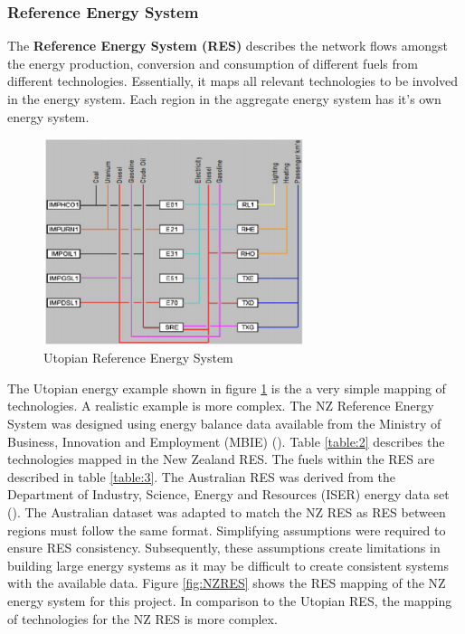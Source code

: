 \documentclass[12pt]{article}
\begin{document}
\subsubsection{Reference Energy System}
The \textbf{Reference Energy System (RES)} describes the network flows amongst the energy production, conversion and consumption of different fuels from different technologies.
Essentially, it maps all relevant technologies to be involved in the energy system. Each region in the aggregate energy system has it's own energy system.

\begin{figure}
	\begin{center}
		\includegraphics[width=0.68\textwidth]{URES.png}
	\end{center}
	\caption{Utopian Reference Energy System}
	\label{fig:URES}
\end{figure}
The Utopian energy example shown in figure \ref{fig:URES} is the a very simple mapping of technologies.
A realistic example is more complex. The NZ Reference Energy System was designed using energy balance data available from
the Ministry of Business, Innovation and Employment (MBIE) (\cite{MBIE_ESEM}). 
Table \ref{table:2} describes the technologies mapped in the New Zealand RES.
The fuels within the RES are described in table \ref{table:3}.
The Australian RES was derived from the Department of Industry, Science, Energy and Resources (ISER) energy data set (\cite{DOEA_ESEM}).
The Australian dataset was adapted to match the NZ RES as RES between regions must follow the same format. 
Simplifying assumptions were required to ensure RES consistency.  
Subsequently, these assumptions create limitations in building large energy systems as it may be difficult to create consistent systems with the available data.
Figure \ref{fig:NZRES} shows the RES mapping of the NZ energy system for this project.
In comparison to the Utopian RES, the mapping of technologies for the NZ RES is more complex.
\end{document}
